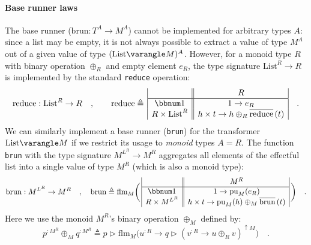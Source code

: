 \paragraph{Base runner laws}

The base runner ($\text{brun}:T^{A}\rightarrow M^{A}$) cannot be
implemented for arbitrary types $A$: since a list may be empty, it
is not always possible to extract a value of type $M^{A}$ out of
a given value of type $(\text{\text{List}}\varangle M)^{A}$. However,
for a monoid type $R$ with binary operation $\oplus_{R}$ and empty
element $e_{R}$, the type signature $\text{List}^{R}\rightarrow R$
is implemented by the standard \lstinline!reduce! operation: 
\[
\text{reduce}:\text{List}^{R}\rightarrow R\quad,\quad\quad\text{reduce}\triangleq\,\begin{array}{|c||c|}
 & R\\
\hline \bbnum 1 & 1\rightarrow e_{R}\\
R\times\text{List}^{R} & h\times t\rightarrow h\oplus_{R}\overline{\text{reduce}}\,(t)
\end{array}\quad.
\]
We can similarly implement a base runner (\lstinline!brun!) for the
transformer $\text{List}\varangle M$ if we restrict its usage to
\emph{monoid} types $A=R$. The function \lstinline!brun! with the
type signature $M^{L^{R}}\rightarrow M^{R}$ aggregates all elements
of the effectful list into a single value of type $M^{R}$ (which
is also a monoid type):
\[
\text{brun}:M^{L^{R}}\rightarrow M^{R}\quad,\quad\text{brun}\triangleq\text{flm}_{M}\bigg(\,\begin{array}{|c||c|}
 & M^{R}\\
\hline \bbnum 1 & 1\rightarrow\text{pu}_{M}(e_{R})\\
R\times M^{L^{R}} & h\times t\rightarrow\text{pu}_{M}(h)\oplus_{M}\overline{\text{brun}}\,(t)
\end{array}\,\bigg)\quad.
\]
Here we use the monoid $M^{R}$\textsf{'}s binary operation $\oplus_{M}$ defined
by:
\begin{equation}
p^{:M^{R}}\oplus_{M}q^{:M^{R}}\triangleq p\triangleright\text{flm}_{M}\big(u^{:R}\rightarrow q\triangleright(v^{:R}\rightarrow u\oplus_{R}v)^{\uparrow M}\big)\quad.\label{eq:definition-of-oplus-M-monad-monoid-1}
\end{equation}

